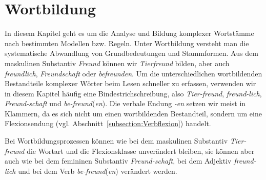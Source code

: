 \chapter{Wortbildung}\label{chapter:Wortbildung}

In diesem Kapitel geht es um die Analyse und Bildung komplexer Wortstämme nach bestimmten Modellen bzw. Regeln. Unter Wortbildung versteht man die systematische Abwandlung von Grundbedeutungen und Stammformen. Aus dem maskulinen Substantiv \textit{Freund} können wir \textit{Tierfreund} bilden, aber auch \textit{freundlich}, \textit{Freundschaft} oder \textit{befreunden}. Um die unterschiedlichen wortbildenden Bestandteile komplexer Wörter beim Lesen schneller zu erfassen, verwenden wir in diesem Kapitel häufig eine Bindestrichschreibung, also \textit{Tier-freund}, \textit{freund-lich}, \textit{Freund-schaft} und \textit{be-freund}(\textit{en}). Die verbale Endung \textit{-en} setzen wir meist in Klammern, da es sich nicht um einen wortbildenden Bestandteil, sondern um eine Flexionsendung (vgl. Abschnitt~\ref{subsection:Verbflexion}) handelt. 

Bei Wortbildungsprozessen können wie bei dem maskulinen Substantiv \textit{Tier-freund} die Wortart und die Flexionsklasse unverändert bleiben, sie können aber auch wie bei dem femininen Substantiv \textit{Freund-schaft}, bei dem Adjektiv \textit{freund-lich} und bei dem Verb \textit{be-freund}(\textit{en}) verändert werden. 

